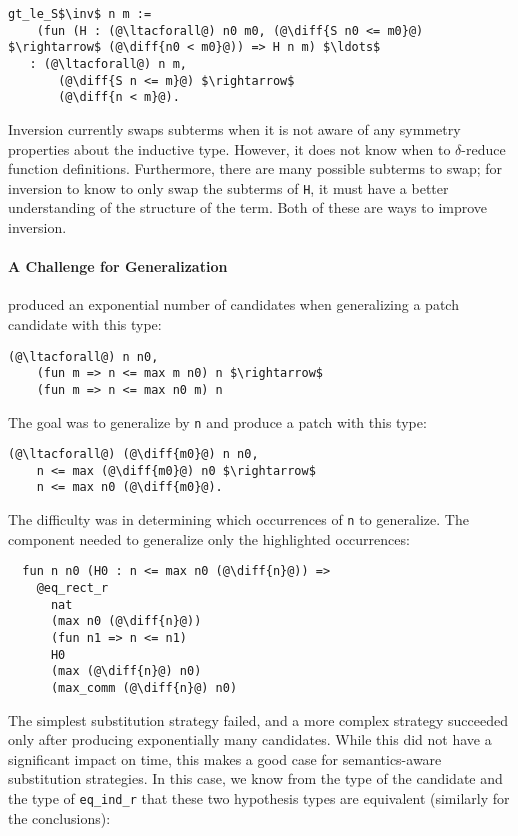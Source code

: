 \begin{lstlisting}[language=coq]
  gt_le_S$\inv$ n m :=
    (fun (H : (@\ltacforall@) n0 m0, (@\diff{S n0 <= m0}@) $\rightarrow$ (@\diff{n0 < m0}@)) => H n m) $\ldots$
   : (@\ltacforall@) n m,
       (@\diff{S n <= m}@) $\rightarrow$
       (@\diff{n < m}@).
\end{lstlisting}

Inversion currently swaps subterms when it is not
aware of any symmetry properties about the inductive type. However,
it does not know when to $\delta$-reduce function definitions. Furthermore, 
there are many possible subterms to swap;
for inversion to know to only swap the subterms of \lstinline{H}, it must have a better
understanding of the structure of the term. Both of these are ways to improve inversion.

\paragraph{A Challenge for Generalization}  produced an exponential number of candidates when generalizing a patch candidate with this type:

\begin{lstlisting}[language=coq]
  (@\ltacforall@) n n0,
    (fun m => n <= max m n0) n $\rightarrow$
    (fun m => n <= max n0 m) n
\end{lstlisting}
The goal was to generalize by \lstinline{n} and produce a patch with this type:

\begin{lstlisting}[language=coq]
  (@\ltacforall@) (@\diff{m0}@) n n0,
    n <= max (@\diff{m0}@) n0 $\rightarrow$
    n <= max n0 (@\diff{m0}@).
\end{lstlisting}
The difficulty was in determining which occurrences of \lstinline{n} to generalize.
The component needed to generalize only the highlighted occurrences:

\begin{lstlisting}
  fun n n0 (H0 : n <= max n0 (@\diff{n}@)) =>
    @eq_rect_r
      nat
      (max n0 (@\diff{n}@))
      (fun n1 => n <= n1)
      H0
      (max (@\diff{n}@) n0)
      (max_comm (@\diff{n}@) n0)
\end{lstlisting}
The simplest substitution strategy failed, and a more
complex strategy
succeeded only after producing exponentially many candidates.
While this did not have a significant impact on time,
this makes a good case for semantics-aware substitution strategies.
In this case, we know from the type of the candidate
and the type of \lstinline{eq_ind_r} that these two hypothesis types 
are equivalent (similarly for the conclusions):

